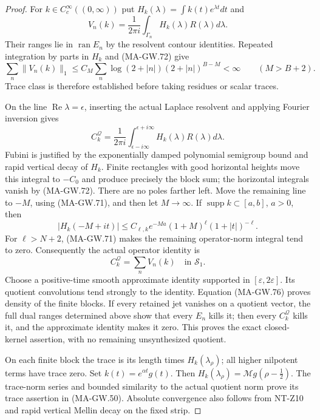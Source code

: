 \begin{proof}
For \(k\in C_c^\infty((0,\infty))\) put
\(H_k(\lambda)=\int k(t)e^{\lambda t}dt\) and
\[
 V_n(k)=\frac1{2\pi i}\int_{\Gamma_n}
                             H_k(\lambda)R(\lambda)d\lambda .
 \tag{MA-GW.73}
\]
Their ranges lie in \(\operatorname{ran}E_n\) by the
resolvent contour identities.  Repeated integration by
parts in \(H_k\) and (MA-GW.72) give
\[
 \sum_n\|V_n(k)\|_1
  \le C_M\sum_n\log(2+|n|)(2+|n|)^{B-M}<\infty
                                             \qquad(M>B+2).
 \tag{MA-GW.74}
\]
Trace class is therefore established before taking residues
or scalar traces.

On the line \(\operatorname{Re}\lambda=\epsilon\), inserting
the actual Laplace resolvent and applying Fourier inversion
gives
\[
 C_k^{\mathcal Q}
   =\frac1{2\pi i}\int_{\epsilon-i\infty}^{\epsilon+i\infty}
                                  H_k(\lambda)R(\lambda)d\lambda .
 \tag{MA-GW.75}
\]
Fubini is justified by the exponentially damped polynomial
semigroup bound and rapid vertical decay of \(H_k\).
Finite rectangles with good horizontal heights move this
integral to \(-C_0\) and produce precisely the block sum;
the horizontal integrals vanish by (MA-GW.72).
There are no poles farther left.  Move the remaining
line to \(-M\), using (MA-GW.71), and then let \(M\to\infty\).
If \(\operatorname{supp}k\subset[a,b]\), \(a>0\), then
\[
 |H_k(-M+it)|
   \le C_{\ell,k}e^{-Ma}(1+M)^\ell(1+|t|)^{-\ell}.
\]
For \(\ell>N+2\), (MA-GW.71) makes the remaining
operator-norm integral tend to zero.
Consequently the actual operator identity is
\[
                          C_k^{\mathcal Q}=\sum_nV_n(k)
                                      \quad\text{in }\mathcal S_1 .
 \tag{MA-GW.76}
\]
Choose a positive-time smooth approximate identity supported
in \([\varepsilon,2\varepsilon]\).
Its quotient convolutions tend strongly to the identity.
Equation (MA-GW.76) proves density of the finite blocks.
If every retained jet vanishes on a quotient vector, the
full dual ranges determined above show that every \(E_n\)
kills it; then every \(C_k^{\mathcal Q}\) kills it, and
the approximate identity makes it zero.
This proves the exact closed-kernel assertion, with no
remaining unsynthesized quotient.

On each finite block the trace is its length times
\(H_k(\lambda_\rho)\); all higher nilpotent terms have
trace zero.  Set \(k(t)=e^{\alpha t}g(t)\).
Then \(H_k(\lambda_\rho)=\mathcal Mg(\rho-\tfrac12)\).
The trace-norm series and bounded similarity to the
actual quotient norm prove its trace assertion in
(MA-GW.50).  Absolute convergence also follows from
NT-Z10 and rapid vertical Mellin decay on the fixed strip.


\end{proof}
